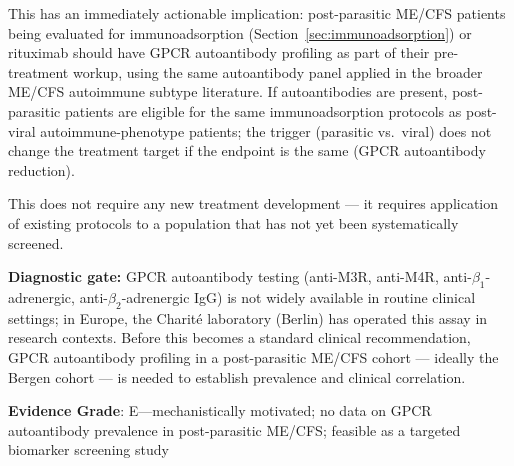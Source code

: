 This has an immediately actionable implication: post-parasitic ME/CFS patients being evaluated for immunoadsorption (Section~\ref{sec:immunoadsorption}) or rituximab should have GPCR autoantibody profiling as part of their pre-treatment workup, using the same autoantibody panel applied in the broader ME/CFS autoimmune subtype literature. If autoantibodies are present, post-parasitic patients are eligible for the same immunoadsorption protocols as post-viral autoimmune-phenotype patients; the trigger (parasitic vs.\ viral) does not change the treatment target if the endpoint is the same (GPCR autoantibody reduction).

This does not require any new treatment development --- it requires application of existing protocols to a population that has not yet been systematically screened.

\textbf{Diagnostic gate:} GPCR autoantibody testing (anti-M3R, anti-M4R, anti-$\beta_1$-adrenergic, anti-$\beta_2$-adrenergic IgG) is not widely available in routine clinical settings; in Europe, the Charit\'e laboratory (Berlin) has operated this assay in research contexts. Before this becomes a standard clinical recommendation, GPCR autoantibody profiling in a post-parasitic ME/CFS cohort --- ideally the Bergen cohort --- is needed to establish prevalence and clinical correlation.

\textbf{Evidence Grade}: E---mechanistically motivated; no data on GPCR autoantibody prevalence in post-parasitic ME/CFS; feasible as a targeted biomarker screening study

